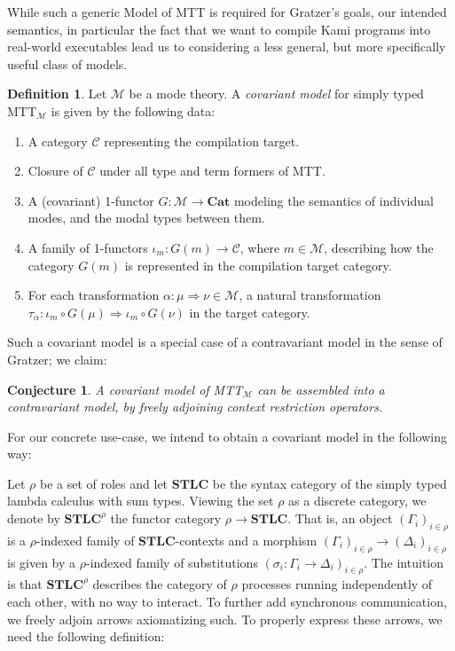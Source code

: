 \documentclass{scrartcl}
\theoremstyle{definition}
\newtheorem{definition}{Definition}
\theoremstyle{plain}
\newtheorem{conjecture}{Conjecture}
\begin{document}
While such a generic Model of MTT is required for Gratzer's goals, our intended
semantics, in particular the fact that we want to compile Kami programs into
real-world executables lead us to considering a less general, but more
specifically useful class of models.

\begin{definition}
  Let $\mathcal{M}$ be a mode theory. A \textit{covariant model} for
  simply typed MTT$_{\mathcal{M}}$ is given by the following data:
  \begin{enumerate}
  \item A category $\mathcal{C}$ representing the compilation target.
  \item Closure of $\mathcal{C}$ under all type and term formers of MTT.
  \item A (covariant) 1-functor $G : \mathcal{M} \to \textbf{Cat}$ modeling the semantics of
    individual modes, and the modal types between them.
  \item A family of 1-functors $\iota_m : G(m) \to \mathcal{C}$, where $m \in
    \mathcal{M}$, describing how the category $G(m)$ is represented in the
    compilation target category.
  \item For each transformation $\alpha : \mu \Rightarrow \nu \in \mathcal{M}$,
    a natural transformation
    $\tau_\alpha : \iota_m \circ G(\mu) \Rightarrow \iota_m \circ G(\nu)$ in the
    target category.
  \end{enumerate}
\end{definition}

Such a covariant model is a special case of a contravariant model in the sense of Gratzer; we claim:

\begin{conjecture}
  A covariant model of MTT$_{\mathcal{M}}$ can be assembled into a contravariant
  model, by freely adjoining context restriction operators.
\end{conjecture}

\medskip

For our concrete use-case, we intend to obtain a covariant model in the following way:

Let $\rho$ be a set of roles and let $\textbf{STLC}$ be the syntax
category of the simply typed lambda calculus with sum types. Viewing the set
$\rho$ as a discrete category, we denote by $\textbf{STLC}^\rho$ the functor
category $\rho \to \textbf{STLC}$. That is, an object $(\Gamma_i)_{i\in\rho}$
is a $\rho$-indexed family of $\textbf{STLC}$-contexts and a morphism
$(\Gamma_i)_{i\in\rho} \to (\Delta_i)_{i\in\rho}$ is given by a $\rho$-indexed
family of substitutions $(\sigma_i : \Gamma_i \to \Delta_i)_{i\in\rho}$. The
intuition is that $\textbf{STLC}^\rho$ describes the category of $\rho$
processes running independently of each other, with no way to interact. To
further add synchronous communication, we freely adjoin arrows axiomatizing
such. To properly express these arrows, we need the following definition:
\end{document}

